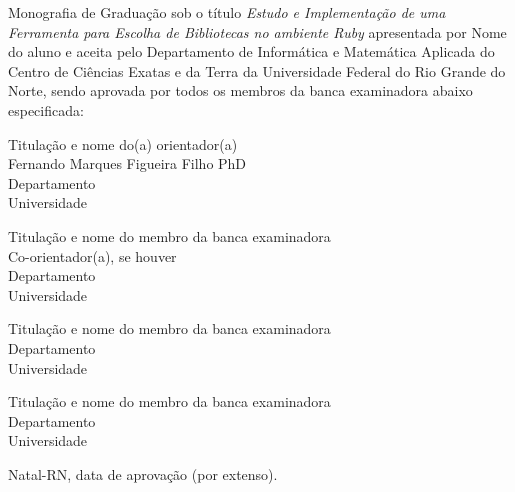 \begin{folhadeaprovacao}
	\setlength{\ABNTsignthickness}{0.4pt}
	\setlength{\ABNTsignwidth}{10cm}
	
	\noindent 
	Monografia de Graduação sob o título \textit{Estudo e Implementação de uma Ferramenta para Escolha de Bibliotecas no ambiente Ruby} apresentada por 
	Nome do aluno e aceita pelo Departamento de Informática e Matemática Aplicada do
	Centro de Ciências Exatas e da Terra da Universidade Federal do Rio Grande do Norte,
	sendo aprovada por todos os membros da banca examinadora abaixo especificada:
		
	\assinatura
	{
		Titulação e nome do(a) orientador(a)\\
		{\small Fernando Marques Figueira Filho PhD} 															\\ 
		{\footnotesize
			Departamento 																	\\
		  	Universidade
		}
	}
	
	\assinatura
	{
		Titulação e nome do membro da banca examinadora							\\
		{\small Co-orientador(a), se houver}										\\ 
		{\footnotesize
			Departamento 																	\\
		  	Universidade
		}
	}
		
	\assinatura
	{
		Titulação e nome do membro da banca examinadora 						 \\ 
		{\footnotesize
			Departamento 																	 \\
		  	Universidade
		}
	}
		
	\assinatura
	{
		Titulação e nome do membro da banca examinadora 						 \\ 
		{\footnotesize
			Departamento 																	 \\
		  	Universidade
		}
	}
		
	\vfill
	
	\begin{center}
		Natal-RN, data de aprovação (por extenso).
	\end{center}
\end{folhadeaprovacao}